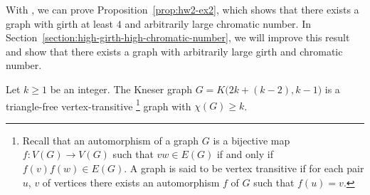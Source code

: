 With , we can prove Proposition~\ref{prop:hw2-ex2},
which shows that there exists a graph with girth at least \(4\) and arbitrarily large chromatic number.
In Section~\ref{section:high-girth-high-chromatic-number}, we will improve this result and show that there exists a graph with arbitrarily large girth and chromatic number.

\begin{proposition} \label{prop:hw2-ex2}
    Let \(k \geq 1\) be an integer.
    The Kneser graph \(G = K\big(2k + (k-2), k-1\big)\) is a triangle-free vertex-transitive%
    \footnote{Recall that an automorphism of a graph \(G\) is a bijective map \(f: V(G) \rightarrow V(G)\) such that \(v w \in E(G)\) if and only if \(f(v) f(w) \in E(G)\). A graph is said to be vertex transitive if for each pair \(u\), \(v\) of vertices there exists an automorphism \(f\) of \(G\) such that \(f(u)=v\).}
    graph with \(\chi(G) \geq k\).
\end{proposition}

